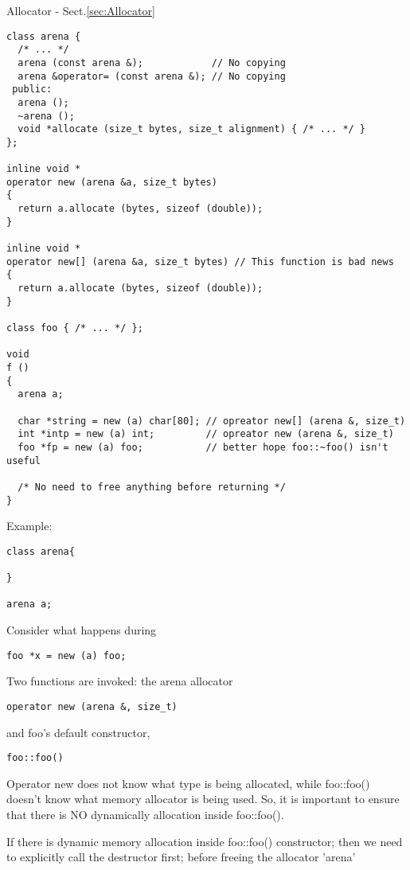 Allocator - Sect.\ref{sec:Allocator}

\begin{verbatim}
class arena {
  /* ... */
  arena (const arena &);            // No copying
  arena &operator= (const arena &); // No copying
 public:
  arena ();
  ~arena ();
  void *allocate (size_t bytes, size_t alignment) { /* ... */ }
};

inline void *
operator new (arena &a, size_t bytes)
{
  return a.allocate (bytes, sizeof (double));
}

inline void *
operator new[] (arena &a, size_t bytes) // This function is bad news
{
  return a.allocate (bytes, sizeof (double));
}

class foo { /* ... */ };

void
f ()
{
  arena a;

  char *string = new (a) char[80]; // opreator new[] (arena &, size_t)
  int *intp = new (a) int;         // opreator new (arena &, size_t)
  foo *fp = new (a) foo;           // better hope foo::~foo() isn't useful

  /* No need to free anything before returning */
}

\end{verbatim}

Example:
\begin{verbatim}
class arena{

}

arena a;

\end{verbatim}

Consider what happens during 
\begin{verbatim}
foo *x = new (a) foo;
\end{verbatim}

Two functions are invoked: the arena allocator
\begin{verbatim}
operator new (arena &, size_t)
\end{verbatim}
and foo's default constructor, 
\begin{verbatim}
foo::foo()
\end{verbatim}

Operator new does not know what type is being allocated, while foo::foo() doesn't know what memory allocator is being used.
So, it is important to ensure that  there is NO dynamically allocation inside foo::foo().

If there is dynamic memory allocation inside foo::foo() constructor; then we need to explicitly call the destructor first; before 
freeing the allocator 'arena'

